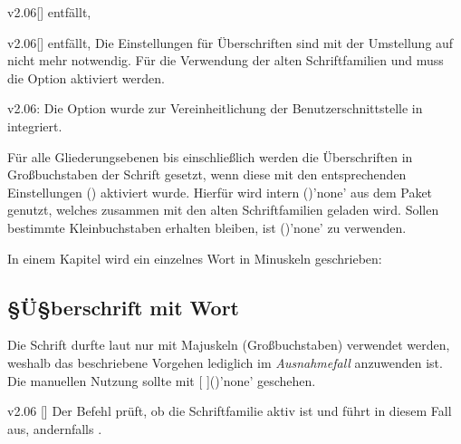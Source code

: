\begin{Obsolete}{v2.06}[]{}{%
  entfällt, %
}
\begin{Obsolete}{v2.06}[]{}{%
  entfällt, %
}
\printobsoletelist%
%
Die Einstellungen für Überschriften sind mit der Umstellung auf \OpenSans nicht 
mehr notwendig. Für die Verwendung der alten Schriftfamilien \Univers und \DIN 
muss die Option  aktiviert werden.
\end{Obsolete}
\end{Obsolete}

\begin{Obsolete}{v2.06:}{%
}
\printobsoletelist%
%
Die Option  wurde zur Vereinheitlichung der 
Benutzerschnittstelle in  integriert.
\end{Obsolete}


%
Für alle Gliederungsebenen bis einschließlich  werden 
die Überschriften in Großbuchstaben der Schrift \DIN gesetzt, wenn diese mit 
den entsprechenden Einstellungen () aktiviert 
wurde. Hierfür wird intern ()'none'
aus dem Paket  genutzt, welches zusammen mit den alten 
Schriftfamilien geladen wird. Sollen bestimmte Kleinbuchstaben erhalten 
bleiben, ist ()'none' zu verwenden.
%
\begin{Example}
In einem Kapitel wird ein einzelnes Wort in Minuskeln geschrieben:
\begin{Code}[escapechar=§]
\chapter{§Ü§berschrift mit  Wort}
\end{Code}
\end{Example}
%
Die Schrift \DIN durfte laut \CD nur mit Majuskeln (Großbuchstaben) verwendet 
werden, weshalb das beschriebene Vorgehen lediglich im \emph{Ausnahmefall} 
anzuwenden ist. Die manuellen Nutzung sollte mit 
[%
]()'none' geschehen.

\begin{Obsolete}{v2.06}{%
  []
}%
\printobsoletelist%
%
Der Befehl  prüft, ob die Schriftfamilie \DIN aktiv ist und führt 
in diesem Fall  aus, andernfalls . 
\end{Obsolete}



